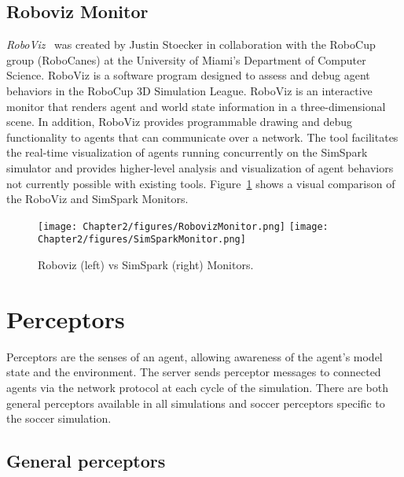 \subsection{Roboviz Monitor}
\textit{RoboViz}~\cite{Roboviz} was created by Justin Stoecker in collaboration with the RoboCup group (RoboCanes) at the University of Miami's Department of Computer Science.
RoboViz is a software program designed to assess and debug agent behaviors in the RoboCup 3D Simulation League. RoboViz is an interactive monitor that renders agent and world state information in a three-dimensional scene. In addition, RoboViz provides programmable drawing and debug functionality to agents that can communicate over a network. The tool facilitates the real-time visualization of agents running concurrently on the SimSpark simulator and provides higher-level analysis and visualization of agent behaviors not currently possible with existing tools. Figure~\ref{fig:Roboviz} shows a visual comparison of the RoboViz and SimSpark Monitors.

\begin{figure}[t!] 
  \begin{center}
    \texttt{[image: Chapter2/figures/RobovizMonitor.png]}
    \texttt{[image: Chapter2/figures/SimSparkMonitor.png]}
  \end{center}
  \caption{Roboviz (left) vs SimSpark (right) Monitors.}
  \label{fig:Roboviz}
\end{figure}





\section{Perceptors}
Perceptors are the senses of an agent, allowing awareness of the agent's model state and the environment.
The server sends perceptor messages to connected agents via the network protocol at each cycle of the simulation.
There are both general perceptors available in all simulations and soccer perceptors specific to the soccer simulation.



\subsection{General perceptors}

